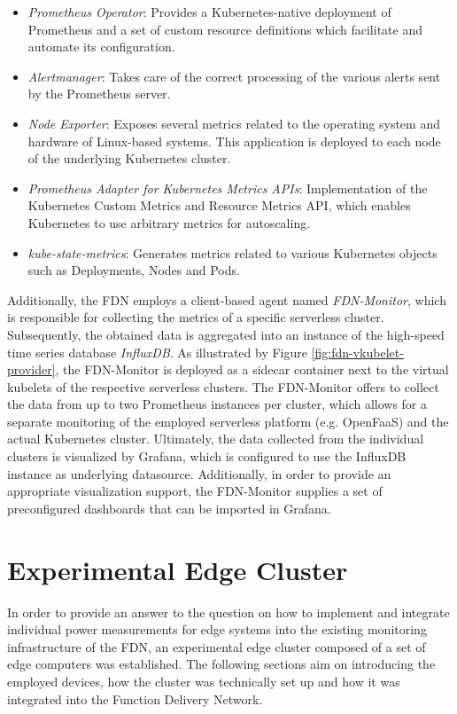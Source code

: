 \begin{itemize}
    \item \textit{Prometheus Operator}: Provides a Kubernetes-native deployment of Prometheus and a set of custom resource definitions which facilitate and automate its configuration.
    \item \textit{Alertmanager}: Takes care of the correct processing of the various alerts sent by the Prometheus server.
    \item \textit{Node Exporter}: Exposes several metrics related to the operating system and hardware of Linux-based systems. This application is deployed to each node of the underlying Kubernetes cluster.
    \item \textit{Prometheus Adapter for Kubernetes Metrics APIs}: Implementation of the Kubernetes Custom Metrics and Resource Metrics API, which enables Kubernetes to use arbitrary metrics for autoscaling.
    \item \textit{kube-state-metrics}: Generates metrics related to various Kubernetes objects such as Deployments, Nodes and Pods.
\end{itemize}

Additionally, the FDN employs a client-based agent named \textit{FDN-Monitor}, which is responsible for collecting the metrics of a specific serverless cluster. Subsequently, the obtained data is aggregated into an instance of the high-speed time series database \textit{InfluxDB}. As illustrated by Figure \ref{fig:fdn-vkubelet-provider}, the FDN-Monitor is deployed as a sidecar container next to the virtual kubelets of the respective serverless clusters. The FDN-Monitor offers to collect the data from up to two Prometheus instances per cluster, which allows for a separate monitoring of the employed serverless platform (e.g. OpenFaaS) and the actual Kubernetes cluster. Ultimately, the data collected from the individual clusters is visualized by Grafana, which is configured to use the InfluxDB instance as underlying datasource. Additionally, in order to provide an appropriate visualization support, the FDN-Monitor supplies a set of preconfigured dashboards that can be imported in Grafana. 


\section{Experimental Edge Cluster}
In order to provide an answer to the question on how to implement and integrate individual power measurements for edge systems into the existing monitoring infrastructure of the FDN, an experimental edge cluster composed of a set of edge computers was established. The following sections aim on introducing the employed devices, how the cluster was technically set up and how it was integrated into the Function Delivery Network.

